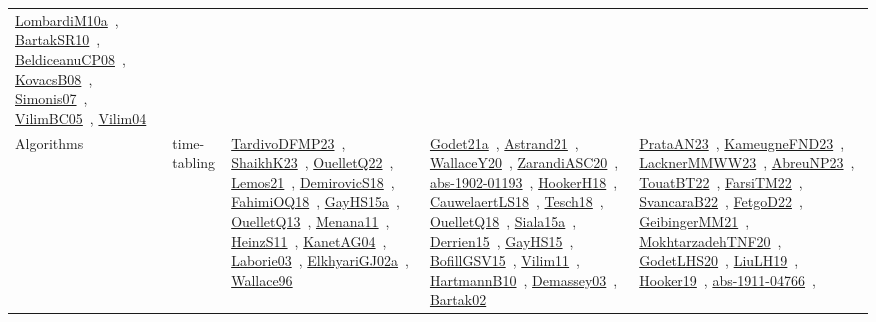 {\begin{longtable}{lp{3cm}>{\raggedright\arraybackslash}p{6cm}>{\raggedright\arraybackslash}p{6cm}>{\raggedright\arraybackslash}p{8cm}}
\href{works/LombardiM10a.pdf}{LombardiM10a}~\cite{LombardiM10a}, \href{works/BartakSR10.pdf}{BartakSR10}~\cite{BartakSR10}, \href{works/BeldiceanuCP08.pdf}{BeldiceanuCP08}~\cite{BeldiceanuCP08}, \href{works/KovacsB08.pdf}{KovacsB08}~\cite{KovacsB08}, \href{works/Simonis07.pdf}{Simonis07}~\cite{Simonis07}, \href{works/VilimBC05.pdf}{VilimBC05}~\cite{VilimBC05}, \href{works/Vilim04.pdf}{Vilim04}~\cite{Vilim04}\\
Algorithms & time-tabling & \href{works/TardivoDFMP23.pdf}{TardivoDFMP23}~\cite{TardivoDFMP23}, \href{works/ShaikhK23.pdf}{ShaikhK23}~\cite{ShaikhK23}, \href{works/OuelletQ22.pdf}{OuelletQ22}~\cite{OuelletQ22}, \href{works/Lemos21.pdf}{Lemos21}~\cite{Lemos21}, \href{works/DemirovicS18.pdf}{DemirovicS18}~\cite{DemirovicS18}, \href{works/FahimiOQ18.pdf}{FahimiOQ18}~\cite{FahimiOQ18}, \href{works/GayHS15a.pdf}{GayHS15a}~\cite{GayHS15a}, \href{works/OuelletQ13.pdf}{OuelletQ13}~\cite{OuelletQ13}, \href{works/Menana11.pdf}{Menana11}~\cite{Menana11}, \href{works/HeinzS11.pdf}{HeinzS11}~\cite{HeinzS11}, \href{works/KanetAG04.pdf}{KanetAG04}~\cite{KanetAG04}, \href{works/Laborie03.pdf}{Laborie03}~\cite{Laborie03}, \href{works/ElkhyariGJ02a.pdf}{ElkhyariGJ02a}~\cite{ElkhyariGJ02a}, \href{works/Wallace96.pdf}{Wallace96}~\cite{Wallace96} & \href{works/Godet21a.pdf}{Godet21a}~\cite{Godet21a}, \href{works/Astrand21.pdf}{Astrand21}~\cite{Astrand21}, \href{works/WallaceY20.pdf}{WallaceY20}~\cite{WallaceY20}, \href{works/ZarandiASC20.pdf}{ZarandiASC20}~\cite{ZarandiASC20}, \href{works/abs-1902-01193.pdf}{abs-1902-01193}~\cite{abs-1902-01193}, \href{works/HookerH18.pdf}{HookerH18}~\cite{HookerH18}, \href{works/CauwelaertLS18.pdf}{CauwelaertLS18}~\cite{CauwelaertLS18}, \href{works/Tesch18.pdf}{Tesch18}~\cite{Tesch18}, \href{works/OuelletQ18.pdf}{OuelletQ18}~\cite{OuelletQ18}, \href{works/Siala15a.pdf}{Siala15a}~\cite{Siala15a}, \href{works/Derrien15.pdf}{Derrien15}~\cite{Derrien15}, \href{works/GayHS15.pdf}{GayHS15}~\cite{GayHS15}, \href{works/BofillGSV15.pdf}{BofillGSV15}~\cite{BofillGSV15}, \href{works/Vilim11.pdf}{Vilim11}~\cite{Vilim11}, \href{works/HartmannB10.pdf}{HartmannB10}~\cite{HartmannB10}, \href{works/Demassey03.pdf}{Demassey03}~\cite{Demassey03}, \href{works/Bartak02.pdf}{Bartak02}~\cite{Bartak02} & \href{works/PrataAN23.pdf}{PrataAN23}~\cite{PrataAN23}, \href{works/KameugneFND23.pdf}{KameugneFND23}~\cite{KameugneFND23}, \href{works/LacknerMMWW23.pdf}{LacknerMMWW23}~\cite{LacknerMMWW23}, \href{works/AbreuNP23.pdf}{AbreuNP23}~\cite{AbreuNP23}, \href{works/TouatBT22.pdf}{TouatBT22}~\cite{TouatBT22}, \href{works/FarsiTM22.pdf}{FarsiTM22}~\cite{FarsiTM22}, \href{works/SvancaraB22.pdf}{SvancaraB22}~\cite{SvancaraB22}, \href{works/FetgoD22.pdf}{FetgoD22}~\cite{FetgoD22}, \href{works/GeibingerMM21.pdf}{GeibingerMM21}~\cite{GeibingerMM21}, \href{works/MokhtarzadehTNF20.pdf}{MokhtarzadehTNF20}~\cite{MokhtarzadehTNF20}, \href{works/GodetLHS20.pdf}{GodetLHS20}~\cite{GodetLHS20}, \href{works/LiuLH19.pdf}{LiuLH19}~\cite{LiuLH19}, \href{works/Hooker19.pdf}{Hooker19}~\cite{Hooker19}, \href{works/abs-1911-04766.pdf}{abs-1911-04766}~\cite{abs-1911-04766}, 
\end{longtable}}
